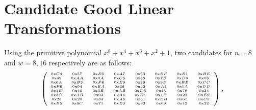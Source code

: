 
\section{Candidate Good Linear Transformations}
\label{sec:candidates-good-linear}

Using the primitive polynomial $x^8+x^4+x^3+x^2+1$, two candidates for $n = 8$ and $w = 8,16$ respectively are as follows:
\small
\[\tiny
\left(
\begin{array}{cccccccc}
\text{0x}C4~& \text{0x}57~& \text{0x}E6~& \text{0x}A7~& \text{0x}63~& \text{0x}EF~& \text{0x}E1~& \text{0x}BE\\
\text{0x}49~& \text{0x}AA~& \text{0x}0A~& \text{0x}C5~& \text{0x}88~& \text{0x}7B~& \text{0x}D6~& \text{0x}08\\
\text{0x}6A~& \text{0x}B3~& \text{0x}F8~& \text{0x}E9~& \text{0x}26~& \text{0x}9D~& \text{0x}BE~& \text{0x}CC\\
\text{0x}F8~& \text{0x}04~& \text{0x}EA~& \text{0x}36~& \text{0x}42~& \text{0x}A4~& \text{0x}1A~& \text{0x}DD\\
\text{0x}1B~& \text{0x}46~& \text{0x}3B~& \text{0x}AB~& \text{0x}D3~& \text{0x}43~& \text{0x}78~& \text{0x}24\\
\text{0x}3C~& \text{0x}AB~& \text{0x}03~& \text{0x}A4~& \text{0x}E5~& \text{0x}1F~& \text{0x}22~& \text{0x}E9\\
\text{0x}23~& \text{0x}20~& \text{0x}84~& \text{0x}A8~& \text{0x}61~& \text{0x}EB~& \text{0x}61~& \text{0x}C5\\
\text{0x}B5~& \text{0x}8C~& \text{0x}71~& \text{0x}E3~& \text{0x}93~& \text{0x}09~& \text{0x}12~& \text{0x}22
\end{array}
\right),
\]
%
